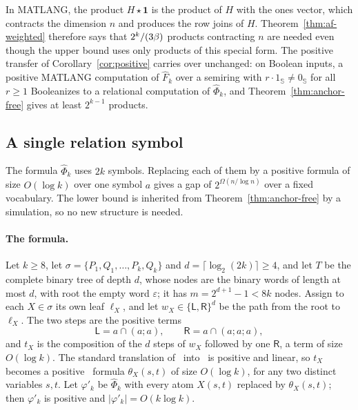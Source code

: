 In MATLANG, the product $H\star\mathbf 1$ is the product of $H$ with
the ones vector, which contracts the dimension $n$ and produces the row
joins of $H$. Theorem~\ref{thm:af-weighted} therefore says that
$2^k/(3\beta)$ products contracting $n$ are needed even though the
upper bound uses only products of this special form.
The positive transfer of Corollary~\ref{cor:positive} carries over
unchanged: on Boolean inputs, a positive MATLANG computation of
$\widehat F_k$ over a semiring with $r\cdot1_{\mathbb S}\ne0_{\mathbb S}$
for all $r\ge1$ Booleanizes to a relational computation of
$\widehat\Phi_k$, and Theorem~\ref{thm:anchor-free} gives at least
$2^{k-1}$ products.

\subsection{A single relation symbol}\label{app:af-fixed}
The formula $\widehat\Phi_k$ uses $2k$ symbols. Replacing each of them by a
positive formula of size $O(\log k)$ over one symbol $a$ gives a gap of
$2^{\Omega(n/\log n)}$ over a fixed vocabulary. The lower bound is inherited
from Theorem~\ref{thm:anchor-free} by a simulation, so no new structure is
needed.

\paragraph{The formula.}
Let $k\ge8$, let $\sigma=\{P_1,Q_1,\ldots,P_k,Q_k\}$ and
$d=\lceil\log_2(2k)\rceil\ge4$, and let $T$ be the complete binary tree of
depth $d$, whose nodes are the binary words of length at most $d$, with
root the empty word $\varepsilon$; it has $m=2^{d+1}-1<8k$ nodes. Assign to
each $X\in\sigma$ its own leaf $\ell_X$, and let
$w_X\in\{\mathsf L,\mathsf R\}^d$ be the path from the root to $\ell_X$.
The two steps are the positive terms
\[
 \mathsf L=a\cap(a;a),\qquad \mathsf R=a\cap(a;a;a),
\]
and $t_X$ is the composition of the $d$ steps of $w_X$ followed by one
$\mathsf R$, a term of size $O(\log k)$. The standard translation of \CoR\
into \FOthree\ is positive and linear, so $t_X$ becomes a positive
\FOthree\ formula $\theta_X(s,t)$ of size $O(\log k)$, for any two distinct
variables $s,t$. Let $\varphi'_k$ be $\widehat\Phi_k$ with every atom
$X(s,t)$ replaced by $\theta_X(s,t)$; then $\varphi'_k$ is positive and
$|\varphi'_k|=O(k\log k)$.

